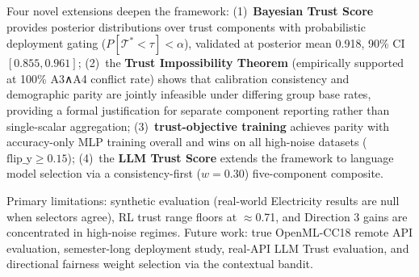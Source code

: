 \documentclass[10pt]{article}
\newcommand{\trust}{\mathcal{T}}
\begin{document}
Four novel extensions deepen the framework: (1)~\textbf{Bayesian Trust Score} provides posterior distributions over trust components with probabilistic deployment gating ($P[\trust^*<\tau]<\alpha$), validated at posterior mean 0.918, 90\% CI $[0.855, 0.961]$; (2)~the \textbf{Trust Impossibility Theorem} (empirically supported at 100\% A3∧A4 conflict rate) shows that calibration consistency and demographic parity are jointly infeasible under differing group base rates, providing a formal justification for separate component reporting rather than single-scalar aggregation; (3)~\textbf{trust-objective training} achieves parity with accuracy-only MLP training overall and wins on all high-noise datasets ($\text{flip\_y}\geq0.15$); (4)~the \textbf{LLM Trust Score} extends the framework to language model selection via a consistency-first ($w{=}0.30$) five-component composite.

Primary limitations: synthetic evaluation (real-world Electricity results are null when selectors agree), RL trust range floors at $\approx$0.71, and Direction 3 gains are concentrated in high-noise regimes. Future work: true OpenML-CC18 remote API evaluation, semester-long deployment study, real-API LLM Trust evaluation, and directional fairness weight selection via the contextual bandit.
\end{document}
